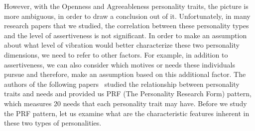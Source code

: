 \documentclass[12pt]{article}
\begin{document}
\par However, with the Openness and Agreeableness personality traits, the picture is more ambiguous, in order to draw a conclusion out of it. Unfortunately, in many research papers that we studied, the correlation between these personality types and the level of assertiveness is not significant.
In order to make an assumption about what level of vibration would better characterize these two personality dimensions, we need to refer to other factors.
For example, in addition to assertiveness, we can also consider which motives or needs these individuals pursue and therefore, make an assumption based on this additional factor.
The authors of the following papers~\cite{costa1988catalog} studied the relationship between personality traits and needs and provided us PRF (The Personality Research Form) pattern, which measures 20 needs that each personality trait may have.
Before we study the PRF pattern, let us examine what are the characteristic features inherent in these two types of personalities.
\end{document}
